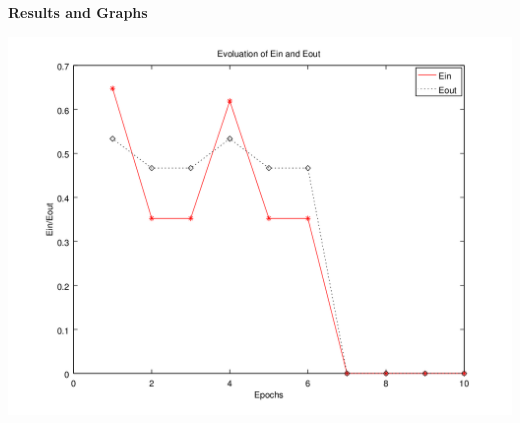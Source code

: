 \documentclass{sem6}
\begin{document}
\newpage
\textbf{Results and Graphs}

\begin{center}
\includegraphics[scale=.6]{../perceptron/perceptron.png}
\end{center}

\newpage
\end{document}
